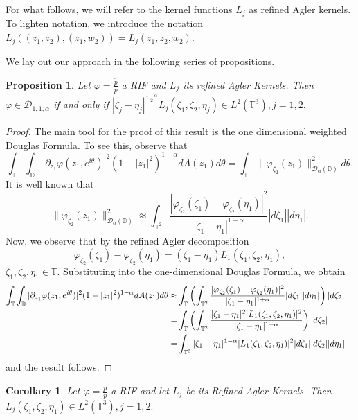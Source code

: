 \documentclass[11pt]{amsart}
\newtheorem{proposition}[theorem]{Proposition}
\newtheorem{corollary}[theorem]{Corollary}
\numberwithin{equation}{section}
\begin{document}
For what follows, we will refer to the kernel functions $L_j$ as refined Agler kernels. To lighten notation, we introduce the notation $L_{j}((z_1,z_2),(z_1,w_2))=L_j(z_1,z_2,w_2)$.

We lay out our approach in the following series of propositions.
\begin{proposition} Let $\varphi=\frac{\tilde{p}}{p}$ a RIF and $L_j$ its refined Agler Kernels. Then $\varphi\in \mathcal{D}_{1,1,\alpha}$ if and only if
$|\zeta_j-\eta_j|^{\frac{1-\alpha}{2}}L_{j}(\zeta_1,\zeta_2,\eta_j)\in L^2(\mathbb{T}^3), j=1,2.$
\label{5.1.}
\end{proposition}
\begin{proof} The main tool for the proof of this result is the one dimensional weighted Douglas Formula. To see this, observe that 
$$\int_{\mathbb{T}}\int_{\mathbb{D}}|\partial_{z_1}\varphi(z_1,e^{i\theta})|^2(1-|z_1|^2)^{1-\alpha}dA(z_1)d\theta=\int_{\mathbb{T}}\|\varphi_{\zeta_2}(z_1)\|^2_{\mathcal{D}_{\alpha}(\mathbb{D})}d\theta.$$
It is well known that
$$\|\varphi_{\zeta_2}(z_1)\|^2_{\mathcal{D}_{\alpha}(\mathbb{D})}\approx\int_{\mathbb{T}^2}\frac{|\varphi_{\zeta_2}(\zeta_1)-\varphi_{\zeta_2}(\eta_1)|^2}{|\zeta_1-\eta_1|^{1+\alpha}}|d\zeta_1||d\eta_1|.$$
Now, we observe that by the refined Agler decomposition
$$\varphi_{\zeta_2}(\zeta_1)-\varphi_{\zeta_2}(\eta_1)=(\zeta_1-\eta_1)L_1(\zeta_1,\zeta_2,\eta_1),$$
$\zeta_1,\zeta_2,\eta_1 \in\mathbb{T}.$ Substituting into the one-dimensional Douglas Formula, we obtain
\begin{align}
\int_{\mathbb{T}}\int_{\mathbb{D}}|\partial_{z_1}\varphi(z_1,e^{i\theta})|^2(1-|z_1|^2)^{1-\alpha}dA(z_1)d\theta\approx &\int_{\mathbb{T}}\left(\int_{\mathbb{T}^2}\frac{|\varphi_{\zeta_2}(\zeta_1)-\varphi_{\zeta_2}(\eta_1)|^2}{|\zeta_1-\eta_1|^{1+\alpha}}|d\zeta_1||d\eta_1|\right)|d\zeta_2|&&\\
=&\int_{\mathbb{T}}\left(\int_{\mathbb{T}^2}\frac{|\zeta_1-\eta_1|^2|L_1(\zeta_1,\zeta_2,\eta_1)|^2}{|\zeta_1-\eta_1|^{1+\alpha}}\right)|d\zeta_2| \notag&&\\
=&\int_{\mathbb{T}^3}|\zeta_1-\eta_1|^{1-\alpha}|L_1(\zeta_1,\zeta_2,\eta_1)|^2|d\zeta_1||d\zeta_2||d\eta_1|\notag 
\end{align}
and the result follows.
\end{proof}
\begin{corollary} Let $\varphi=\frac{\widetilde{p}}{p}$ a RIF and let $L_j$ be its Refined Agler Kernels. Then $L_{j}(\zeta_1,\zeta_2,\eta_1)\in L^2(\mathbb{T}^3), j=1,2.$
\end{corollary}
\end{document}

